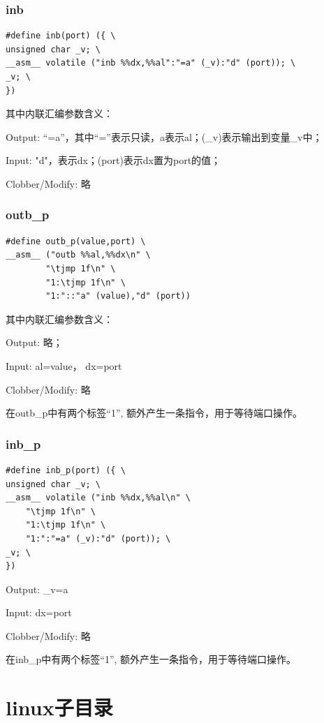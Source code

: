 \documentclass[12pt]{article}
\begin{document}
\subsubsection{inb}	
\begin{lstlisting}[breaklines]
#define inb(port) ({ \
unsigned char _v; \
__asm__ volatile ("inb %%dx,%%al":"=a" (_v):"d" (port)); \
_v; \
})
\end{lstlisting}
其中内联汇编参数含义：
\begin{list}{•}{•}
\item Output: “=a”，其中“=”表示只读，a表示al；(\_v)表示输出到变量\_v中；
\item Input: "d"，表示dx；(port)表示dx置为port的值；
\item Clobber/Modify: 略
\end{list}
\subsubsection{outb\_p}	
\begin{lstlisting}[breaklines]
#define outb_p(value,port) \
__asm__ ("outb %%al,%%dx\n" \
		"\tjmp 1f\n" \
		"1:\tjmp 1f\n" \
		"1:"::"a" (value),"d" (port))
\end{lstlisting}
其中内联汇编参数含义：
\begin{list}{•}{•}
\item Output: 略；
\item Input: al=value， dx=port
\item Clobber/Modify: 略
\end{list}
在outb\_p中有两个标签“1”, 额外产生一条指令，用于等待端口操作。
\subsubsection{inb\_p}	
\begin{lstlisting}[breaklines]
#define inb_p(port) ({ \
unsigned char _v; \
__asm__ volatile ("inb %%dx,%%al\n" \
	"\tjmp 1f\n" \
	"1:\tjmp 1f\n" \
	"1:":"=a" (_v):"d" (port)); \
_v; \
})
\end{lstlisting}
\begin{list}{•}{•}
\item Output: \_v=a 
\item Input: dx=port
\item Clobber/Modify: 略
\end{list}
在inb\_p中有两个标签“1”, 额外产生一条指令，用于等待端口操作。
\section{linux子目录}
\end{document}
